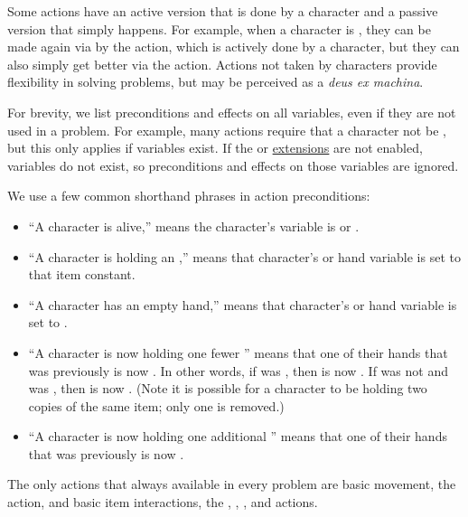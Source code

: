 \documentclass{nilreport}
\begin{document}
Some actions have an active version that is done by a character and a passive version that simply happens. For example, when a character is , they can be made  again via by the  action, which is actively done by a character, but they can also simply get better via the  action. Actions not taken by characters provide flexibility in solving problems, but may be perceived as a {\em deus ex machina}. 

For brevity, we list preconditions and effects on all variables, even if they are not used in a problem. For example, many actions require that a character not be , but this only applies if  variables exist. If the  or  \hyperref[sec:extensions]{extensions} are not enabled,  variables do not exist, so preconditions and effects on those variables are ignored.

We use a few common shorthand phrases in action preconditions:
\begin{itemize}
	\item ``A character is alive,'' means the character's  variable is  or .
	\item ``A character is holding an ,'' means that character's  or  hand variable is set to that item constant.
	\item ``A character has an empty hand,'' means that character's  or  hand variable is set to \None.
	\item ``A character is now holding one fewer '' means that one of their hands that was previously  is now \None. In other words, if  was , then  is now \None. If  was not  and  was , then  is now \None. (Note it is possible for a character to be holding two copies of the same item; only one is removed.)
	\item ``A character is now holding one additional '' means that one of their hands that was previously \None is now .
\end{itemize}

The only actions that always available in every problem are basic movement, the  action, and basic item interactions, the , , , and  actions.
\end{document}
